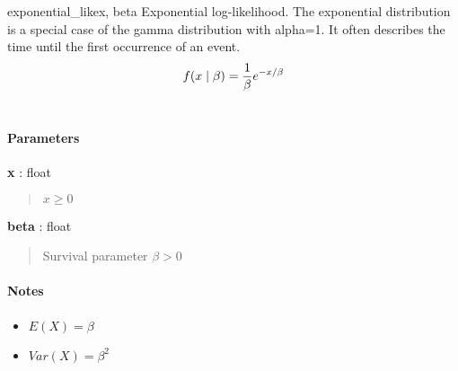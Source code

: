 \hypertarget{pymc.distributions.exponential_like}{}
\begin{funcdesc}{exponential\_like}{x, beta}
Exponential log-likelihood. The exponential distribution is a special case of the gamma distribution
with alpha=1. It often describes the time until the first occurrence of an event.
\begin{gather}
\begin{split}f(x \mid \beta) = \frac{1}{\beta}e^{-x/\beta}\end{split}\notag\\\begin{split}\end{split}\notag
\end{gather}
\paragraph{Parameters}
\begin{paramlist}
\item[] \textbf{x} : float
\begin{quote}

$x \ge 0$
\end{quote}

\item[] \textbf{beta} : float
\begin{quote}

Survival parameter $\beta > 0$
\end{quote}
\end{paramlist}
\paragraph{Notes}
\begin{itemize}
\item {} 
$E(X) = \beta$

\item {} 
$Var(X) = \beta^2$

\end{itemize}
\end{funcdesc}

